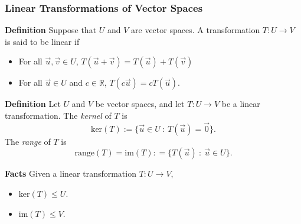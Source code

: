  \begin{frame}[fragile]\frametitle{Linear Transformations of Vector Spaces}
\textbf{Definition}
Suppose that $U$ and $V$ are vector spaces.  A transformation $T: U \longrightarrow V$
is said to be linear if 
\begin{itemize}
\item For all $\vec{u}, \vec{v}\in U$, 
$T(\vec{u} + \vec{v} ) = T(\vec{u}) + T(\vec{v})$
\item For all $\vec{u} \in U$ and $c \in \mathbb R$, 
$T(c\vec{u}) = cT(\vec{u})$.
\end{itemize}



\textbf{Definition}
Let $U$ and $V$ be vector spaces, and let $T : U \longrightarrow V$ be a linear transformation.
The {\em kernel} of $T$ is 
\[
\mbox{ker}(T) := \{\vec{u}\in U \ : \ T(\vec{u}) = \vec{0} \}.
\]
The {\em range} of $T$ is 
\[
\mbox{range}(T) = \mbox{im}(T): = \{T(\vec{u}) \ : \ \vec{u} \in U \}.
\]

\end{frame}






 \begin{frame}[fragile]
\textbf{Facts}
Given a linear transformation $T: U \longrightarrow V$,
\begin{itemize}
\item ker$(T) \le U$.
\item im$(T)\le V$.
\end{itemize}


%
\end{frame}




